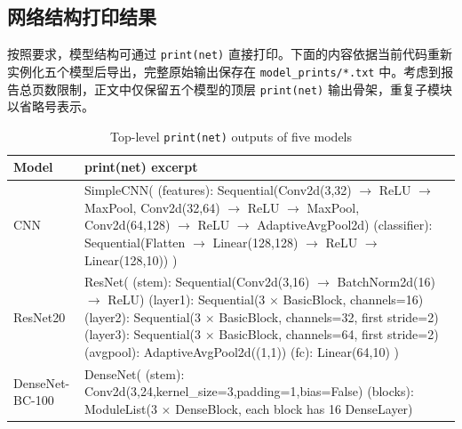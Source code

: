 \documentclass[a4paper]{article}
\begin{document}
\subsection{网络结构打印结果}
按照要求，模型结构可通过 \texttt{print(net)} 直接打印。下面的内容依据当前代码重新实例化五个模型后导出，完整原始输出保存在 \texttt{model\_prints/*.txt} 中。考虑到报告总页数限制，正文中仅保留五个模型的顶层 \texttt{print(net)} 输出骨架，重复子模块以省略号表示。

\begin{table}[htbp]
\centering
\caption{Top-level \texttt{print(net)} outputs of five models}
\scriptsize
\setlength{\tabcolsep}{4pt}
\begin{tabular}{p{} p{}}
\toprule
Model & \ttfamily print(net) excerpt \\
\midrule
CNN &
\parbox[t]{0.81\textwidth}{\ttfamily
SimpleCNN(\\
\quad (features): Sequential(Conv2d(3,32) $\rightarrow$ ReLU $\rightarrow$ MaxPool,\\
\qquad Conv2d(32,64) $\rightarrow$ ReLU $\rightarrow$ MaxPool,\\
\qquad Conv2d(64,128) $\rightarrow$ ReLU $\rightarrow$ AdaptiveAvgPool2d)\\
\quad (classifier): Sequential(Flatten $\rightarrow$ Linear(128,128) $\rightarrow$ ReLU $\rightarrow$ Linear(128,10))\\
)}
\\[2mm]
ResNet20 &
\parbox[t]{0.81\textwidth}{\ttfamily
ResNet(\\
\quad (stem): Sequential(Conv2d(3,16) $\rightarrow$ BatchNorm2d(16) $\rightarrow$ ReLU)\\
\quad (layer1): Sequential(3 $\times$ BasicBlock, channels=16)\\
\quad (layer2): Sequential(3 $\times$ BasicBlock, channels=32, first stride=2)\\
\quad (layer3): Sequential(3 $\times$ BasicBlock, channels=64, first stride=2)\\
\quad (avgpool): AdaptiveAvgPool2d((1,1))\\
\quad (fc): Linear(64,10)\\
)}
\\[2mm]
DenseNet-BC-100 &
\parbox[t]{0.81\textwidth}{\ttfamily
DenseNet(\\
\quad (stem): Conv2d(3,24,kernel\_size=3,padding=1,bias=False)\\
\quad (blocks): ModuleList(3 $\times$ DenseBlock, each block has 16 DenseLayer)\\
}
\end{tabular}
\end{table}
\end{document}

